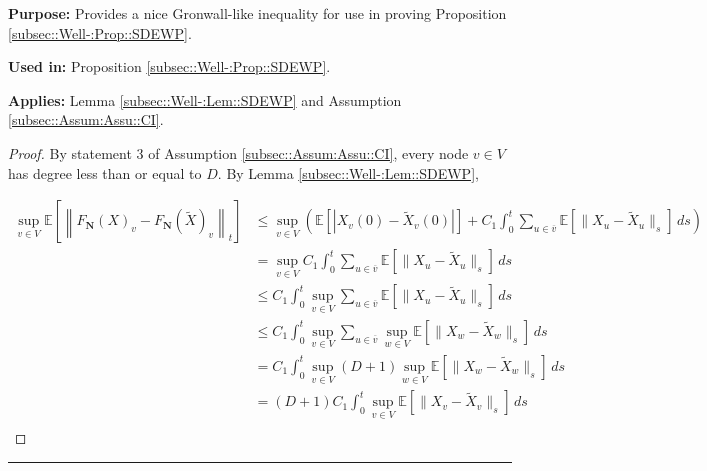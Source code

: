 \documentclass[12pt]{article}
\newcommand{\mb}{\mathbb}
\newcommand{\ov}{\overline}
\newcommand{\purpose}{\textbf{Purpose: }}
\newcommand{\usein}{\textbf{Used in: }}
\newcommand{\app}{\textbf{Applies: }}
\newcommand{\lin}{\rule{\linewidth}{0.4 pt}}
\newcommand{\ex}[1]{\mb{E}\left[#1\right]}			%
\renewcommand{\v}{v}							%
\newcommand{\vv}{u}								%
\newcommand{\vvv}{w}							%
\renewcommand{\t}{t}							%
\renewcommand{\tt}{s}							%
\newcommand{\X}{X}								%
\newcommand{\cind}[1]{_{#1}}					%
\newcommand{\cl}{\ov}							%
\newcommand{\tp}[1]{(#1)}						%
\newcommand{\const}{C}							%
\newcommand{\degr}{D}							%
\newcommand{\poisses}{\mathbf{N}}				%
\newcommand{\Fpo}{F_{\poisses}}					%
\newcommand{\alt}[1]{\widetilde{#1}}			%
\newcommand{\indx}[1]{_{#1}}					%
\begin{document}
\purpose Provides a nice Gronwall-like inequality for use in proving Proposition \ref{subsec::Well-:Prop::SDEWP}.

\usein Proposition \ref{subsec::Well-:Prop::SDEWP}.

\app Lemma \ref{subsec::Well-:Lem::SDEWP} and Assumption \ref{subsec::Assum:Assu::CI}.

\begin{proof}
By statement 3 of Assumption \ref{subsec::Assum:Assu::CI}, every node \(v \in V\) has degree less than or equal to \(\degr\). By Lemma \ref{subsec::Well-:Lem::SDEWP},

\begin{align*}
\sup_{\v \in V} \ex{\left\|\Fpo(\X)\cind{\v} - \Fpo(\alt{\X})\cind{\v}\right\|_\t} &\leq \sup_{\v\in V}\left(\ex{|\X\cind{\v}\tp{0} - \alt{\X}\cind{\v}\tp{0}|} +  \const\indx{1}\int_0^\t \sum_{\vv\in \cl{\v}} \ex{\|\X\cind{\vv} - \alt{\X}\cind{\vv}\|_\tt}\,d\tt\right)\\
&=\sup_{\v \in V} \const\indx{1}\int_0^\t \sum_{\vv \in \cl{\v}} \ex{\|\X\cind{\vv} - \alt{\X}\cind{\vv}\|_\tt}\,d\tt\\
&\leq \const\indx{1}\int_0^\t \sup_{\v \in V}\sum_{\vv \in \cl{\v}} \ex{\|\X\cind{\vv} - \alt{\X}\cind{\vv}\|_\tt}\,d\tt\\
&\leq \const\indx{1}\int_0^\t \sup_{\v \in V}\sum_{\vv \in \cl{\v}}\sup_{\vvv\in V} \ex{\|\X\cind{\vvv} - \alt{\X}\cind{\vvv}\|_\tt}\,d\tt\\
&= \const\indx{1}\int_0^\t \sup_{\v \in V}(\degr+1)\sup_{\vvv\in V} \ex{\|\X\cind{\vvv} - \alt{\X}\cind{\vvv}\|_\tt}\,d\tt\\
&= (\degr+1)\const\indx{1}\int_0^\t \sup_{\v\in V} \ex{\|\X\cind{\v} - \alt{\X}\cind{\v}\|_\tt}\,d\tt\\
\end{align*}
\end{proof}
\lin
\end{document}
